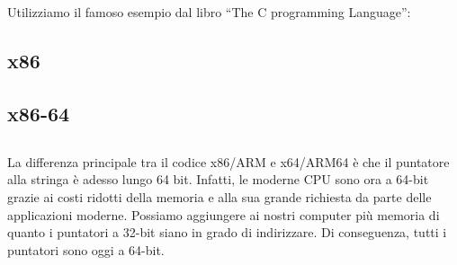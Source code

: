\chapter{\HelloWorldSectionName}
\label{sec:helloworld}

Utilizziamo il famoso esempio dal libro
``The C programming Language''\cite{Kernighan:1988:CPL:576122}:



\section{x86}




\section{x86-64}







\section{\Conclusion{}}

La differenza principale tra il codice x86/ARM e x64/ARM64 è che il puntatore alla stringa è adesso lungo 64 bit.
Infatti, le moderne \ac{CPU} sono ora a 64-bit grazie ai costi ridotti della memoria e alla sua grande richiesta da parte delle applicazioni moderne. 
Possiamo aggiungere ai nostri computer più memoria di quanto i puntatori a 32-bit siano in grado di indirizzare.  
Di conseguenza, tutti i puntatori sono oggi a 64-bit.


